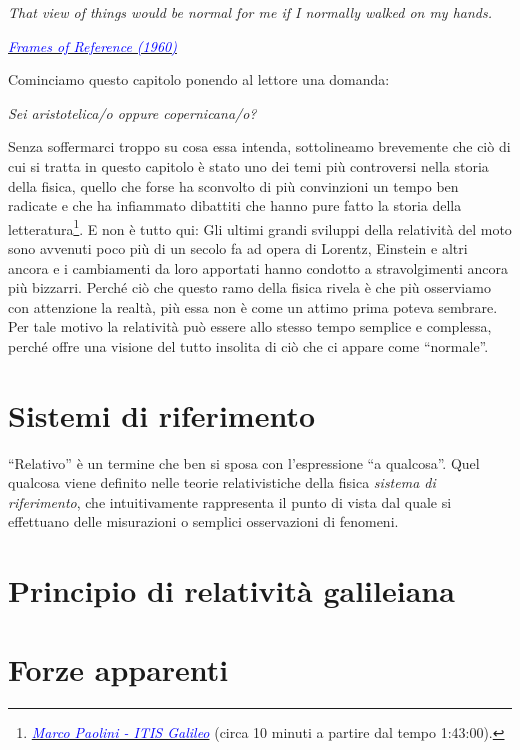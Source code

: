 \marginpar{\minitoc}

\epigraph{\emph{That view of things would be normal for me if I normally walked on my hands.}}{\href{https://www.youtube.com/watch?v=bJMYoj4hHqU}{\textcolor{blue}{\textit{Frames of Reference (1960)}}}}

Cominciamo questo capitolo ponendo al lettore una domanda:

\begin{center}
    \textit{Sei aristotelica/o oppure copernicana/o?}
\end{center}

\noindent Senza soffermarci troppo su cosa essa intenda,
sottolineamo brevemente che ciò di cui si tratta in questo capitolo
è stato uno dei temi più controversi nella storia della fisica, quello
che forse ha sconvolto di più convinzioni un tempo ben radicate e
che ha infiammato dibattiti che hanno pure fatto la storia della
letteratura\footnote{\href{https://youtu.be/0kxarmulkiA?feature=shared&t=6180}{\textcolor{blue}{\textit{Marco Paolini - ITIS Galileo}}} (circa 10 minuti a partire dal tempo 1:43:00).}. E non è tutto qui: Gli ultimi grandi sviluppi della relatività
del moto sono avvenuti poco più di un secolo fa ad opera di Lorentz, Einstein
e altri ancora e i cambiamenti da loro apportati hanno condotto a
stravolgimenti ancora più bizzarri. Perché ciò che questo ramo della
fisica rivela è che più osserviamo con attenzione la realtà, più essa non
è come un attimo prima poteva sembrare. Per tale motivo la relatività può
essere allo stesso tempo semplice e complessa, perché offre una visione
del tutto insolita di ciò che ci appare come ``normale''.


\section{Sistemi di riferimento}
``Relativo'' è un termine che ben si sposa con l'espressione ``a qualcosa''.
Quel qualcosa viene definito nelle teorie relativistiche della fisica
\textit{sistema di riferimento}, che intuitivamente rappresenta il punto di
vista dal quale si effettuano delle misurazioni o semplici osservazioni di
fenomeni.

\section{Principio di relatività galileiana}
\section{Forze apparenti}


